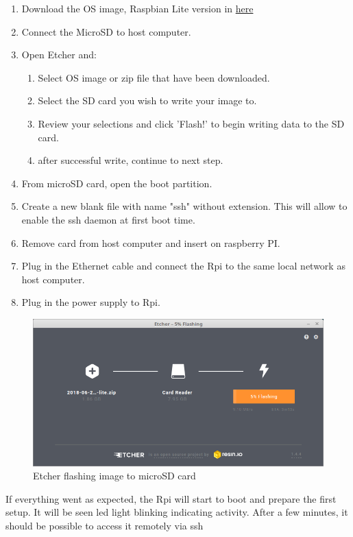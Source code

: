 \begin{enumerate}
	\tightlist
	\item Download the \gls{OS} image, Raspbian Lite version in \href{https://www.raspberrypi.org/downloads/raspbian/}{here}
	\item Connect the MicroSD to host computer.
	\item Open Etcher and:
	\begin{enumerate}
		\item Select \gls{OS} image or zip file that have been downloaded.
		\item Select the SD card you wish to write your image to.
		\item Review your selections and click 'Flash!' to begin writing data to the SD card.
		\item after successful write, continue to next step.
	\end{enumerate}
	\item From microSD card, open the boot partition.
	\item Create a new blank file with name "ssh" without extension. This will allow to enable the ssh daemon at first boot time.
	\item Remove card from host computer and insert on raspberry PI.
	\item Plug in the Ethernet cable and connect the \gls{Rpi} to the same  local network as host computer.
	\item Plug in the power supply to \gls{Rpi}.
\end{enumerate}

\begin{figure}
	\centering
	\includegraphics[width=0.5\linewidth]{figures/Etcher_flashing.png}
	\caption{Etcher flashing image to microSD card}
	\label{fig:etcher_flashing}
\end{figure}

If everything went as expected, the \gls{Rpi} will start to boot and prepare the first setup. It will be seen led light blinking indicating activity. After a few minutes, it should be possible to access it remotely via ssh



